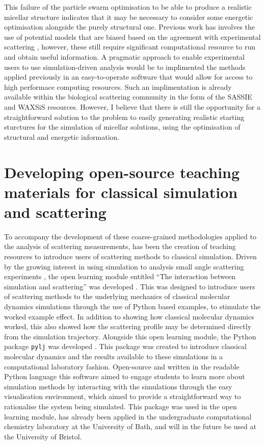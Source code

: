 This failure of the particle swarm optimisation to be able to produce a realistic micellar structure indicates that it may be necessary to consider some energetic optimisation alongside the purely structural one.
Previous work has involves the use of potential models that are biased based on the agreement with experimental scattering \cite{hargreaves_atomistic_2011,ivanovic_temperature-dependent_2018}, however, these still require significant computational resource to run and obtain useful information.
A pragmatic approach to enable experimental users to use simulation-driven analysis would be to implimented the methods applied previously in an easy-to-operate software that would allow for access to high performace computing resources.
Such an implimentation is already available within the biological scattering community in the form of the SASSIE \cite{perkins_atomistic_2016} and WAXSiS \cite{knight_waxsis_2015} resources.
However, I believe that there is still the opportunity for a straightforward solution to the problem to easily generating realistic starting sturctures for the simulation of micellar solutions, using the optimisation of structural and energetic information. 

\section{Developing open-source teaching materials for classical simulation and scattering}
To accompany the development of these coarse-grained methodologies applied to the analysis of scattering measurements, has been the creation of teaching resources to introduce users of scattering methods to classical simulation.
Driven by the growing interest in using simulation to analysis small angle scattering experiments \cite{hub_interpreting_2018,perkins_atomistic_2016}, the open learning module entitled ``The interaction between simulation and scattering'' was developed \cite{mccluskey_pythoninchemistry/sim_and_scat_2019}.
This was designed to introduce users of scattering methods to the underlying mechanics of classical molecular dynamics simulations through the use of Python based examples, to stimulate the worked example effect.
In addition to showing how classical molecular dynamics worked, this also showed how the scattering profile may be determined directly from the simulation trajectory.
Alongside this open learning module, the Python package \texttt{pylj} was developed \cite{mccluskey_pylj_2018,mccluskey_arm61/pylj_2019-2}.
This package was created to introduce classical molecular dynamics and the results available to these simulations in a computational laboratory fashion.
Open-source and written in the readable Python language this software aimed to engage students to learn more about simulation methods by interacting with the simulations through the easy visualisation environment, which aimed to provide a straightforward way to rationalise the system being simulated.
This package was used in the open learning module, has already been applied in the undergraduate computational chemistry laboratory at the University of Bath, and will in the future be used at the University of Bristol.

